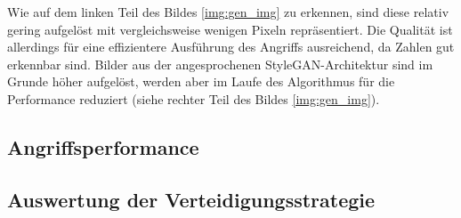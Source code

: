 Wie auf dem linken Teil des Bildes \ref{img:gen_img} zu erkennen, sind diese relativ gering aufgelöst mit vergleichsweise wenigen Pixeln repräsentiert. Die Qualität ist allerdings für eine effizientere Ausführung des Angriffs ausreichend, da Zahlen gut erkennbar sind. Bilder aus der angesprochenen StyleGAN-Architektur sind im Grunde höher aufgelöst, werden aber im Laufe des Algorithmus für die Performance reduziert (siehe rechter Teil des Bildes \ref{img:gen_img}).
\subsection{Angriffsperformance}

\subsection{Auswertung der Verteidigungsstrategie}

